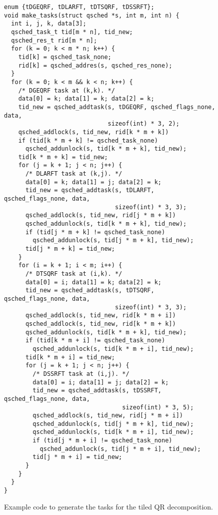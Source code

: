 \documentclass[preprint]{elsarticle}
\begin{document}
\begin{figure}
\begin{center}\begin{minipage}{0.9\textwidth}
    \begin{lstlisting}[basicstyle=\scriptsize\tt]
enum {tDGEQRF, tDLARFT, tDTSQRF, tDSSRFT};
void make_tasks(struct qsched *s, int m, int n) {
  int i, j, k, data[3];
  qsched_task_t tid[m * n], tid_new;
  qsched_res_t rid[m * n];
  for (k = 0; k < m * n; k++) {
    tid[k] = qsched_task_none;
    rid[k] = qsched_addres(s, qsched_res_none);
  }
  for (k = 0; k < m && k < n; k++) {
    /* DGEQRF task at (k,k). */
    data[0] = k; data[1] = k; data[2] = k;
    tid_new = qsched_addtask(s, tDGEQRF, qsched_flags_none, data,
                             sizeof(int) * 3, 2);
    qsched_addlock(s, tid_new, rid[k * m + k])
    if (tid[k * m + k] != qsched_task_none)
      qsched_addunlock(s, tid[k * m + k], tid_new);
    tid[k * m + k] = tid_new;
    for (j = k + 1; j < n; j++) {
      /* DLARFT task at (k,j). */
      data[0] = k; data[1] = j; data[2] = k;
      tid_new = qsched_addtask(s, tDLARFT, qsched_flags_none, data,
                               sizeof(int) * 3, 3);
      qsched_addlock(s, tid_new, rid[j * m + k])
      qsched_addunlock(s, tid[k * m + k], tid_new);
      if (tid[j * m + k] != qsched_task_none)
        qsched_addunlock(s, tid[j * m + k], tid_new);
      tid[j * m + k] = tid_new;
    }
    for (i = k + 1; i < m; i++) {
      /* DTSQRF task at (i,k). */
      data[0] = i; data[1] = k; data[2] = k;
      tid_new = qsched_addtask(s, tDTSQRF, qsched_flags_none, data,
                               sizeof(int) * 3, 3);
      qsched_addlock(s, tid_new, rid[k * m + i])
      qsched_addlock(s, tid_new, rid[k * m + k])
      qsched_addunlock(s, tid[k * m + k], tid_new);
      if (tid[k * m + i] != qsched_task_none)
        qsched_addunlock(s, tid[k * m + i], tid_new);
      tid[k * m + i] = tid_new;
      for (j = k + 1; j < n; j++) {
        /* DSSRFT task at (i,j). */
        data[0] = i; data[1] = j; data[2] = k;
        tid_new = qsched_addtask(s, tDSSRFT, qsched_flags_none, data,
                                 sizeof(int) * 3, 5);
        qsched_addlock(s, tid_new, rid[j * m + i])
        qsched_addunlock(s, tid[j * m + k], tid_new);
        qsched_addunlock(s, tid[k * m + i], tid_new);
        if (tid[j * m + i] != qsched_task_none)
          qsched_addunlock(s, tid[j * m + i], tid_new);
        tid[j * m + i] = tid_new;
      }
    }
  }
}
    \end{lstlisting}
\end{minipage}\end{center}
\caption{Example code to generate the tasks for the tiled
    QR decomposition.}
\label{fig:CodeQR}
\end{figure}
\end{document}
